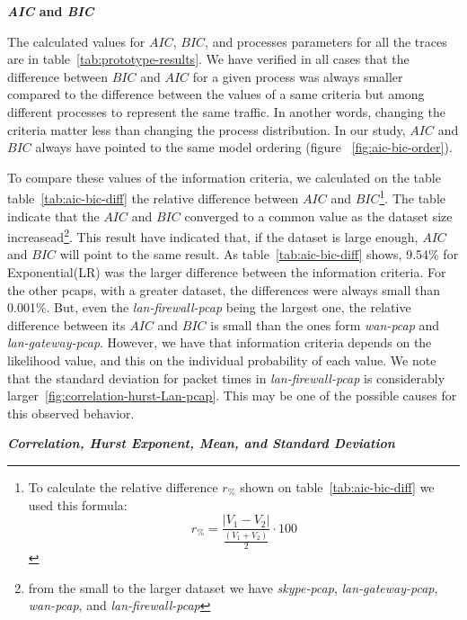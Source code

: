 \smallskip \noindent  \textbf{\textit{AIC} and \textit{BIC}}

The calculated values for $AIC$, $BIC$, and processes parameters for all the traces are in table~\ref{tab:prototype-results}. We have verified in all cases  that the difference between $BIC$ and $AIC$ for a given process was always smaller compared to the difference between the values of a same criteria but among different processes to represent the same traffic. In another words, changing the criteria matter less than changing the process distribution. In our study,  $AIC$ and $BIC$ always have pointed to the same model ordering (figure ~\ref{fig:aic-bic-order}).

To compare these values of the information criteria, we calculated on the table  table~\ref{tab:aic-bic-diff} the relative difference between $AIC$ and $BIC$\footnote{ 
To calculate the relative difference $r_\%$ shown on table~\ref{tab:aic-bic-diff} we used this formula:
\begin{equation}
    r_\% = \frac{|V_1-V_2|}{\frac{(V_1+V_2)}{2}}\cdot100 
\end{equation}
}. The table indicate that the $AIC$ and $BIC$ converged to a common value as  the dataset size increasead\footnote{from the small to the larger dataset we have \textit{skype-pcap}, \textit{lan-gateway-pcap}, \textit{wan-pcap}, and \textit{lan-firewall-pcap}}. 
This result have indicated that, if the dataset is large enough, $AIC$ and $BIC$ will point to the same result. As table~\ref{tab:aic-bic-diff} shows, 9.54\% for Exponential(LR) was the larger difference between the information criteria. For the other pcaps, with a greater dataset, the differences were always small than 0.001\%. But, even the \textit{lan-firewall-pcap} being the largest one, the relative difference between its $AIC$ and $BIC$ is small than the ones form \textit{wan-pcap} and \textit{lan-gateway-pcap}. However, we have that information criteria depends on the likelihood value, and this on the individual probability of each value. We note that the standard deviation for packet times in \textit{lan-firewall-pcap} is considerably larger~\ref{fig:correlation-hurst-Lan-pcap}. This may be one of the possible causes for this observed behavior.



\smallskip \noindent  \textbf{\textit{Correlation, Hurst Exponent, Mean, and Standard Deviation}} 

